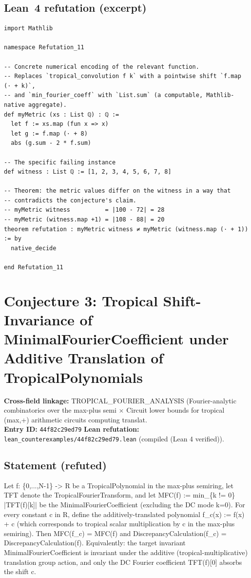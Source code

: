 \documentclass[11pt,a4paper]{article}
\begin{document}
\subsection*{Lean~4 refutation (excerpt)}
\begin{lstlisting}
import Mathlib

namespace Refutation_11

-- Concrete numerical encoding of the relevant function.
-- Replaces `tropical_convolution f k` with a pointwise shift `f.map (· + k)`,
-- and `min_fourier_coeff` with `List.sum` (a computable, Mathlib-native aggregate).
def myMetric (xs : List ℚ) : ℚ :=
  let f := xs.map (fun x => x)
  let g := f.map (· + 8)
  abs (g.sum - 2 * f.sum)

-- The specific failing instance
def witness : List ℚ := [1, 2, 3, 4, 5, 6, 7, 8]

-- Theorem: the metric values differ on the witness in a way that
-- contradicts the conjecture's claim.
-- myMetric witness          = |100 - 72| = 28
-- myMetric (witness.map +1) = |108 - 88| = 20
theorem refutation : myMetric witness ≠ myMetric (witness.map (· + 1)) := by
  native_decide

end Refutation_11
\end{lstlisting}


\section{Conjecture 3: Tropical Shift-Invariance of MinimalFourierCoefficient under Additive Translation of TropicalPolynomials}
\textbf{Cross-field linkage:} TROPICAL\_FOURIER\_ANALYSIS (Fourier-analytic combinatorics over the max-plus semi $\times$ Circuit lower bounds for tropical (max,+) arithmetic circuits computing translat.\\
\textbf{Entry ID:} \texttt{44f82c29ed79}\quad
\textbf{Lean refutation:} \texttt{lean\_counterexamples/44f82c29ed79.lean} (compiled (Lean 4 verified)).

\subsection*{Statement (refuted)}
Let f: \{0,...,N-1\} -> R be a TropicalPolynomial in the max-plus semiring, let TFT denote the TropicalFourierTransform, and let MFC(f) := min\_\{k != 0\} |TFT(f)[k]| be the MinimalFourierCoefficient (excluding the DC mode k=0). For every constant c in R, define the additively-translated polynomial f\_c(x) := f(x) + c (which corresponds to tropical scalar multiplication by c in the max-plus semiring). Then MFC(f\_c) = MFC(f) and DiscrepancyCalculation(f\_c) = DiscrepancyCalculation(f). Equivalently: the target invariant MinimalFourierCoefficient is invariant under the additive (tropical-multiplicative) translation group action, and only the DC Fourier coefficient TFT(f)[0] absorbs the shift c.
\end{document}
